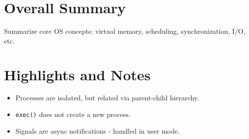 \documentclass[12pt]{article}
\begin{document}
\newpage
\part{Overall Summary}
Summarize core OS concepts: virtual memory, scheduling, synchronization, I/O, etc.

















\newpage
\part{Highlights and Notes}
\begin{itemize}
    \item Processes are isolated, but related via parent-child hierarchy.
    \item \texttt{exec()} does not create a new process.
    \item Signals are async notifications - handled in user mode.
\end{itemize}
\end{document}
